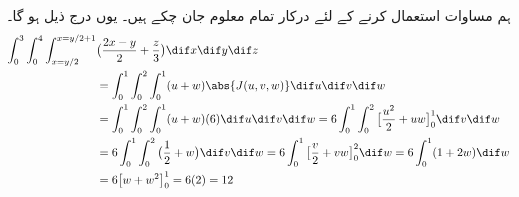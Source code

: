 ہم  مساوات  استعمال کرنے کے لئے درکار تمام معلوم جان چکے ہیں۔ یوں درج ذیل ہو گا۔
\begin{align*}
\int_0^3\int_0^4\int_{x=y/2}^{x=y/2+1}&\big(\frac{2x-y}{2}+\frac{z}{3}\big)\dif x\dif y\dif z\\
&=\int_0^1\int_0^2\int_0^1(u+w)\abs{J(u,v,w)}\dif u\dif v\dif w\\
&=\int_0^1\int_0^2\int_0^1(u+w)(6)\dif u\dif v\dif w=6\int_0^1\int_0^2\big[\frac{u^2}{2}+uw\big]_0^1\dif v\dif w\\
&=6\int_0^1\int_0^2\big(\frac{1}{2}+w\big)\dif v\dif w=6\int_0^1\big[\frac{v}{2}+vw\big]_0^2\dif w=6\int_0^1(1+2w)\dif w\\
&=6\big[w+w^2\big]_0^1=6(2)=12
\end{align*}

